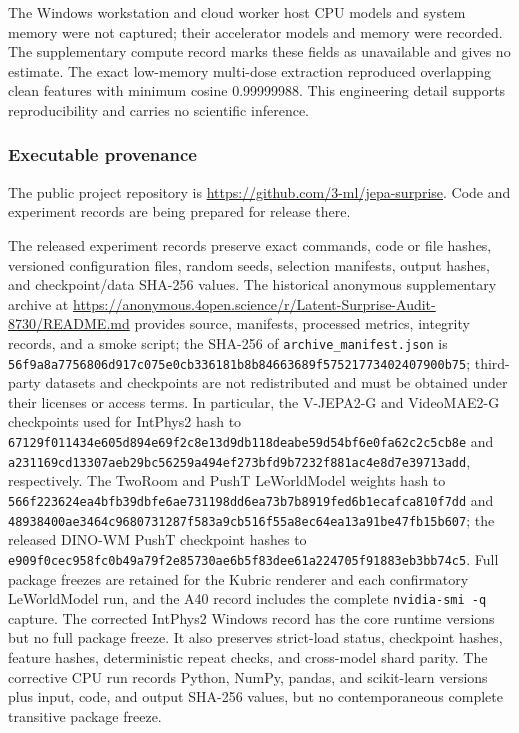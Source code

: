 The Windows workstation and cloud worker host CPU models and system memory were not captured; their accelerator models and memory were recorded. The supplementary compute record marks these fields as unavailable and gives no estimate. {\color{black}The exact low-memory multi-dose extraction reproduced overlapping clean features with minimum cosine 0.99999988. This engineering detail supports reproducibility and carries no scientific inference.}

\FloatBarrier
\subsubsection{Executable provenance}
\label{app:executable-provenance}
The public project repository is \url{https://github.com/3-ml/jepa-surprise}. Code and experiment records are being prepared for release there.

The released experiment records preserve exact commands, code or file hashes, versioned configuration files, random seeds, selection manifests, output hashes, and checkpoint/data SHA-256 values. The historical anonymous supplementary archive at \url{https://anonymous.4open.science/r/Latent-Surprise-Audit-8730/README.md} provides source, manifests, processed metrics, integrity records, and a smoke script; the SHA-256 of \texttt{archive\_manifest.json} is \texttt{56f9a8a7756806d9\allowbreak 17c075e0cb336181\allowbreak b8b84663689f5752\allowbreak 1773402407900b75}; third-party datasets and checkpoints are not redistributed and must be obtained under their licenses or access terms. In particular, the V-JEPA2-G and VideoMAE2-G checkpoints used for IntPhys2 hash to \texttt{67129f011434e605\allowbreak d894e69f2c8e13d9\allowbreak db118deabe59d54b\allowbreak f6e0fa62c2c5cb8e} and \texttt{a231169cd13307ae\allowbreak b29bc56259a494ef\allowbreak 273bfd9b7232f881\allowbreak ac4e8d7e39713add}, respectively. The TwoRoom and PushT LeWorldModel weights hash to \texttt{566f223624ea4bfb\allowbreak 39dbfe6ae731198d\allowbreak d6ea73b7b8919fed\allowbreak 6b1ecafca810f7dd} and \texttt{48938400ae3464c9\allowbreak 680731287f583a9c\allowbreak b516f55a8ec64ea1\allowbreak 3a91be47fb15b607}; the released DINO-WM PushT checkpoint hashes to \texttt{e909f0cec958fc0b\allowbreak 49a79f2e85730ae6\allowbreak b5f83dee61a22470\allowbreak 5f91883eb3bb74c5}. Full package freezes are retained for the Kubric renderer and each confirmatory LeWorldModel run, and the A40 record includes the complete \texttt{nvidia-smi -q} capture. The corrected IntPhys2 Windows record has the core runtime versions but no full package freeze. It also preserves strict-load status, checkpoint hashes, feature hashes, deterministic repeat checks, and cross-model shard parity. The corrective CPU run records Python, NumPy, pandas, and scikit-learn versions plus input, code, and output SHA-256 values, but no contemporaneous complete transitive package freeze.

